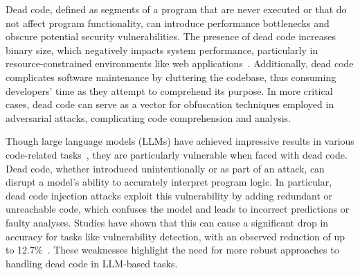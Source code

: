 \documentclass[11pt]{article}
\begin{document}
Dead code, defined as segments of a program that are never executed or that do not affect program functionality, can introduce performance bottlenecks and obscure potential security vulnerabilities. The presence of dead code increases binary size, which negatively impacts system performance, particularly in resource-constrained environments like web applications~\cite{8370748,malavolta2023javascript}. Additionally, dead code complicates software maintenance by cluttering the codebase, thus consuming developers' time as they attempt to comprehend its purpose. In more critical cases, dead code can serve as a vector for obfuscation techniques employed in adversarial attacks, complicating code comprehension and analysis.

Though large language models (LLMs) have achieved impressive results in various code-related tasks~\cite{weicoeditor, jainllm, Tang2024CodeAgentAC, li2024rewriting, han2024archcode}, they are particularly vulnerable when faced with dead code. Dead code, whether introduced unintentionally or as part of an attack, can disrupt a model's ability to accurately interpret program logic. In particular, dead code injection attacks exploit this vulnerability by adding redundant or unreachable code, which confuses the model and leads to incorrect predictions or faulty analyses. Studies have shown that this can cause a significant drop in accuracy for tasks like vulnerability detection, with an observed reduction of up to 12.7\%~\cite{khare2023understanding}. These weaknesses highlight the need for more robust approaches to handling dead code in LLM-based tasks.
\end{document}
